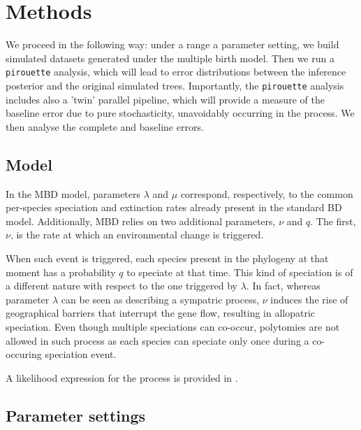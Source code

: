 \section{Methods}

We proceed in the following way:
under a range a parameter setting, 
we build simulated datasets generated under the multiple birth model. 
Then we run a \verb;pirouette; analysis, 
which will lead to error distributions
between the inference posterior and the original simulated trees. 
Importantly, the \verb;pirouette; analysis includes 
also a 'twin' parallel pipeline, 
which will provide a measure of the baseline error 
due to pure stochasticity, unavoidably occurring in the process.
We then analyse the complete and baseline errors.

\subsection{Model}

In the MBD model, parameters $\lambda$ and $\mu$ correspond, respectively, 
to the common per-species speciation and extinction rates 
already present in the standard BD model. 
Additionally, MBD relies on two additional parameters, $\nu$ and $q$. 
The first, $\nu$, is the rate at which an environmental change is triggered.

When such event is triggered, each species present in the phylogeny 
at that moment has a probability $q$ to speciate at that time.
This kind of speciation is of a different nature with respect to 
the one triggered by $\lambda$. 
In fact, whereas parameter $\lambda$ can be seen as 
describing a sympatric process, $\nu$ induces the rise of 
geographical barriers that interrupt the gene flow,
resulting in allopatric speciation. 
Even though multiple speciations can co-occur, 
polytomies are not allowed in such process as each species can speciate only 
once during a co-occuring speciation event.

A likelihood expression for the process is provided in \cite{mbd}.

\subsection{Parameter settings}

